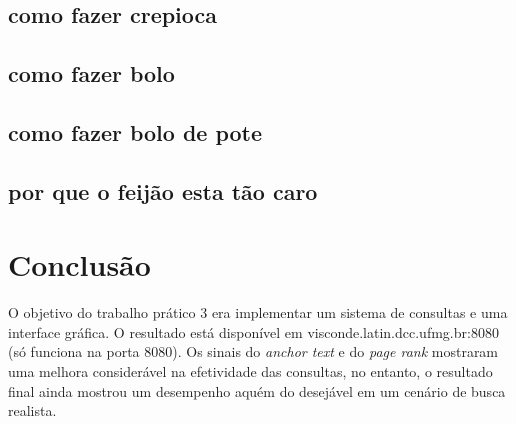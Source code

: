 \documentclass{article}
\begin{document}
\subsection{como fazer crepioca}
\subsection{como fazer bolo}
\subsection{como fazer bolo de pote}
\subsection{por que o feijão esta tão caro}

\section{Conclusão}

O objetivo do trabalho prático 3 era implementar um sistema de consultas e uma interface gráfica. O resultado
está disponível em visconde.latin.dcc.ufmg.br:8080 (só funciona na porta 8080). Os sinais do
\textit{anchor text} e do \textit{page rank} mostraram uma melhora considerável na efetividade
das consultas, no entanto, o resultado final ainda mostrou um desempenho aquém do desejável em
um cenário de busca realista.
\end{document}
